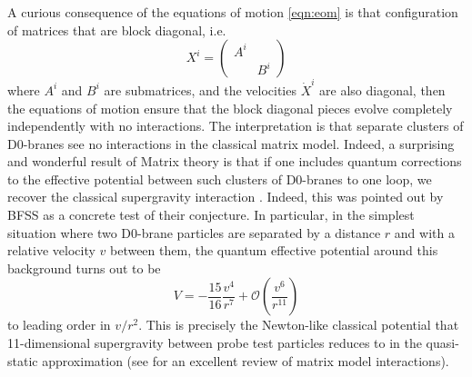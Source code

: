 A curious consequence of the equations of motion \cref{eqn:eom} is that configuration of matrices that are block diagonal, i.e.
\begin{equation}
    X^i = \begin{pmatrix}
        A^i & \\
        & B^i
    \end{pmatrix}
\end{equation}
where $A^i$ and $B^i$ are submatrices, and the velocities $\dot{X}^i$ are also diagonal, then the equations of motion ensure that the block diagonal pieces evolve completely independently with no interactions. The interpretation is that separate clusters of D0-branes see no interactions in the classical matrix model. Indeed, a surprising and wonderful result of Matrix theory is that if one includes quantum corrections to the effective potential between such clusters of D0-branes to one loop, we recover the classical supergravity interaction \cite{Douglas:1996yp,Paban:1998ea,Kabat:1997sa}. Indeed, this was pointed out by BFSS as a concrete test of their conjecture. In particular, in the simplest situation where two D0-brane particles are separated by a distance $r$ and with a relative velocity $v$ between them, the quantum effective potential around this background turns out to be
\begin{equation}
    V = -\frac{15}{16}\frac{v^4}{r^7} + \mathcal{O}\left( \frac{v^6}{r^{11}} \right)
\end{equation}
to leading order in $v/r^2$. This is precisely the Newton-like classical potential that 11-dimensional supergravity between probe test particles reduces to in the quasi-static approximation (see \cite{Taylor:2001vb} for an excellent review of matrix model interactions).


